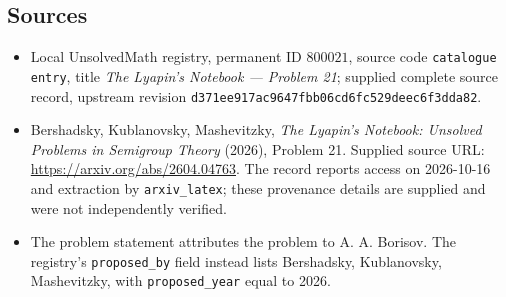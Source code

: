 \documentclass[11pt]{article}
\begin{document}
\subsection{Sources}
\begin{itemize}
\item Local UnsolvedMath registry, permanent ID \(800021\), source code \texttt{catalogue entry}, title \emph{The Lyapin's Notebook --- Problem 21}; supplied complete source record, upstream revision \texttt{d371ee917ac9647fbb06cd6fc529deec6f3dda82}.
\item Bershadsky, Kublanovsky, Mashevitzky, \emph{The Lyapin's Notebook: Unsolved Problems in Semigroup Theory} (2026), Problem 21. Supplied source URL: \url{https://arxiv.org/abs/2604.04763}. The record reports access on 2026-10-16 and extraction by \texttt{arxiv\_latex}; these provenance details are supplied and were not independently verified.
\item The problem statement attributes the problem to A. A. Borisov. The registry's \texttt{proposed\_by} field instead lists Bershadsky, Kublanovsky, Mashevitzky, with \texttt{proposed\_year} equal to 2026.
\end{itemize}
\end{document}
